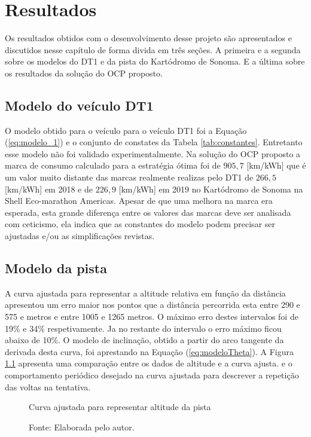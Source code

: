 \chapter{Resultados}
\label{chap:resultados}
\thispagestyle{empty}

Os resultados obtidos com o desenvolvimento desse projeto são apresentados e discutidos nesse capítulo de forma divida em três seções.  
A primeira e a segunda sobre os modelos do DT1 e da pista do Kartódromo de Sonoma. E a última  sobre os resultados da solução do OCP proposto.

\section{Modelo do veículo DT1}
\label{sec:resultados_modelo}

O modelo obtido para o veículo para o veículo DT1 foi a Equação (\ref{eq:modelo_1}) e o conjunto de constates da Tabela \ref{tab:constantes}.
Entretanto esse modelo não foi validado experimentalmente. Na solução do OCP proposto a marca de consumo calculado para a estratégia ótima
foi de $905,7$ [km/kWh] que é um valor muito distante das marcas realmente realizas pelo DT1 de $266,5$ [km/kWh] em 2018 e de $226,9$ [km/kWh] em 2019  no Kartódromo de Sonoma na Shell Eco-marathon Americas. 
Apesar de que uma melhora na marca era esperada, esta grande diferença entre os valores das marcas deve ser analisada com ceticismo, ela indica que as constantes do modelo podem precisar ser ajustadas e/ou as simplificações revistas.


\section{Modelo da pista}
\label{sec:resultados_pista}

A curva ajustada para representar a altitude relativa em função da distância  apresentou um erro maior nos pontos que a distância  percorrida esta entre 290 e 575 e metros e entre 1005 e 1265 metros. O máximo erro destes
intervalos foi de 19\% e 34\% respetivamente. Ja no restante do intervalo o erro máximo ficou abaixo de 10\%. 
O modelo de inclinação, obtido a partir do arco  tangente da derivada desta curva, foi aprestando na Equação (\ref{eq:modeloTheta}). 
A Figura \ref{graf:modelo_pista} apresenta uma comparação entre os dados de altitude e a curva ajusta.
e o comportamento periódico desejado na curva ajustada para descrever a repetição das voltas na tentativa.

\begin{figure}[h]
    \centering
    \caption{Curva ajustada para representar altitude da pista}
    
    \label{graf:modelo_pista}
    \caption*{\footnotesize{Fonte: Elaborada pelo autor.}}
\end{figure}


